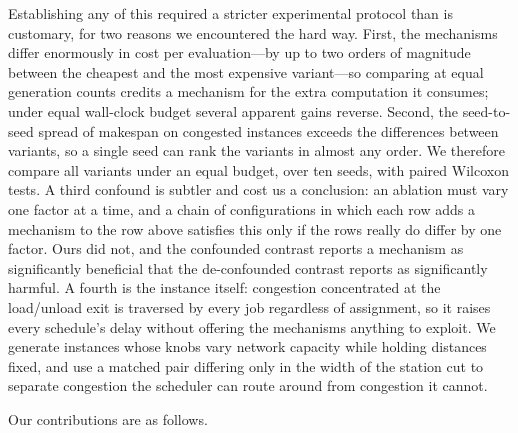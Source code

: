 \documentclass[manuscript,screen,review]{acmart}
\begin{document}
Establishing any of this required a stricter experimental protocol than is
customary, for two reasons we encountered the hard way. First, the mechanisms
differ enormously in cost per evaluation---by up to two orders of magnitude
between the cheapest and the most expensive variant---so comparing at equal
generation counts credits a mechanism for the extra computation it consumes;
under equal wall-clock budget several apparent gains reverse. Second, the
seed-to-seed spread of makespan on congested instances exceeds the differences
between variants, so a single seed can rank the variants in almost any order. We
therefore compare all variants under an equal budget, over ten seeds, with paired
Wilcoxon tests. A third confound is subtler and cost us a conclusion: an ablation
must vary one factor at a time, and a chain of configurations in which each row
adds a mechanism to the row above satisfies this only if the rows really do differ
by one factor. Ours did not, and the confounded contrast reports a mechanism as
significantly beneficial that the de-confounded contrast reports as significantly
harmful. A fourth is the instance itself: congestion concentrated at the
load/unload exit is traversed by every job regardless of assignment, so it raises
every schedule's delay without offering the mechanisms anything to exploit. We
generate instances whose knobs vary network capacity while holding distances
fixed, and use a matched pair differing only in the width of the station cut to
separate congestion the scheduler can route around from congestion it cannot.

Our contributions are as follows.
\end{document}
